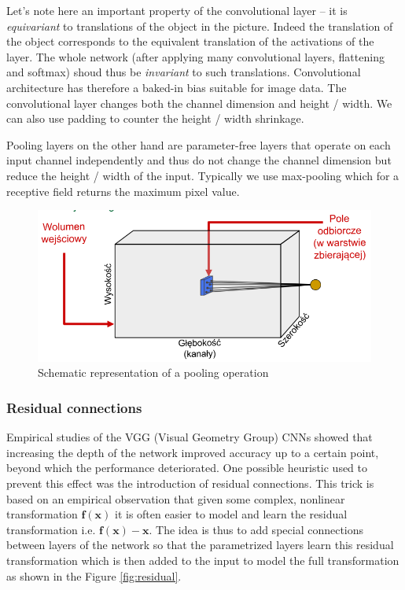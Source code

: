 \documentclass{myclass}
\begin{document}
Let's note here an important property of the convolutional layer -- it is \emph{equivariant} to
translations of the object in the picture. Indeed the translation of the object corresponds to the
equivalent translation of the activations of the layer. The whole network (after applying many
convolutional layers, flattening and softmax) shoud thus be \emph{invariant} to such translations.
Convolutional architecture has therefore a baked-in bias suitable for image data. The convolutional
layer changes both the channel dimension and height / width. We can also use padding to counter the
height / width shrinkage. 

Pooling layers on the other hand are parameter-free layers that operate on each input channel
independently and thus do not change the channel dimension but reduce the height / width of the
input. Typically we use max-pooling which for a receptive field returns the maximum pixel value.

\begin{figure}[ht]
   \centering
   \includegraphics[width=0.9\columnwidth]{figs/maxpool.png}
   \caption{Schematic representation of a pooling operation}
   \label{fig:pool}
\end{figure}

\subsubsection{Residual connections}

Empirical studies of the VGG (Visual Geometry Group) CNNs showed that increasing the depth of the
network improved accuracy up to a certain point, beyond which the performance deteriorated. One
possible heuristic used to prevent this effect was the introduction of residual connections. This
trick is based on an empirical observation that given some complex, nonlinear transformation
$\bm{f}(\bm{x})$ it is often easier to model and learn the residual transformation i.e.
$\bm{f}(\bm{x}) - \bm{x}$. The idea is thus to add special connections between layers of the network
so that the parametrized layers learn this residual transformation which is then added to the input
to model the full transformation as shown in the Figure \ref{fig:residual}.
\end{document}
